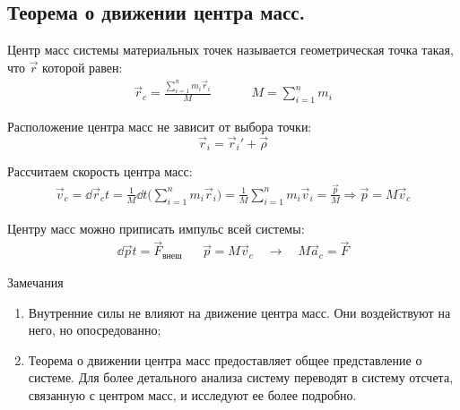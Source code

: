 \subsection{\textbf{Теорема о движении центра масс.}}

Центр масс системы материальных точек называется геометрическая точка такая, что $\vec{r}$ которой равен:
\[\begin{aligned}
	\vec{r}_c = \frac{\sum_{i=1}^{n} m_i \vec{r}_i}{M} &&&& M = \sum_{i=1}^{n} m_i
\end{aligned}\]

Расположение центра масс не зависит от выбора точки:
\[\vec{r}_i = \vec{r}_i' + \vec{\rho}\]

Рассчитаем скорость центра масс:
\begin{multline*}
	\vec{v}_c = \dd{\vec{r}_c}{t} = \frac{1}{M} \dd{}{t} \Big(\sum_{i=1}^{n} m_i \vec{r}_{i}\Big) = \frac{1}{M} \sum_{i=1}^{n} m_i \vec{v}_i = \frac{\vec{p}}{M} \Rightarrow \boxed{\vec{p} = M \vec{v}_c}
\end{multline*}

Центру масс можно приписать импульс всей системы:
\begin{align*}
	\dd{\vec{p}}{t} = \vec{F}_{\text{внеш}} && \vec{p} = M\vec{v}_c \quad\to\quad M\vec{a}_c = \vec{F}
\end{align*}

\begin{tbox}{Замечания}
	\begin{enumerate}
		\item Внутренние силы не влияют на движение центра масс. Они воздействуют на него, но опосредованно;
		\item Теорема о движении центра масс предоставляет общее представление о системе. Для более детального анализа систему переводят в систему отсчета, связанную с центром масс, и исследуют ее более подробно.
	\end{enumerate}
\end{tbox}